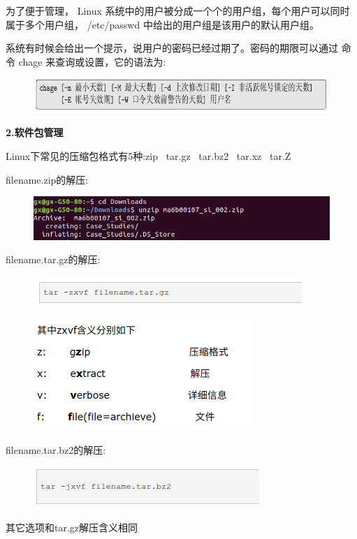 \documentclass[12pt，a4paper]{article}
\numberwithin{equation}{section}
\begin{document}
为了便于管理， Linux 系统中的用户被分成一个个的用户组，每个用户可以同时属于多个用户组， /etc/passwd 中给出的用户组是该用户的默认用户组。

系统有时候会给出一个提示，说用户的密码已经过期了。密码的期限可以通过
命令 chage 来查询或设置，它的语法为:
\begin{figure}[H]
\centering
\includegraphics[scale=0.6]{./figures/28.png}
\end{figure}
\textbf{2.软件包管理}

Linux下常见的压缩包格式有5种:zip ~tar.gz ~tar.bz2 ~tar.xz ~tar.Z

filename.zip的解压:
\begin{figure}[H]
\centering
\includegraphics[scale=0.6]{./figures/284.png}
\end{figure}
filename.tar.gz的解压:
\begin{figure}[H]
\centering
\includegraphics[scale=0.6]{./figures/285.png}
\end{figure}

\begin{figure}[H]
\centering
\includegraphics[scale=0.6]{./figures/286.png}
\end{figure}

filename.tar.bz2的解压:
\begin{figure}[H]
\centering
\includegraphics[scale=0.6]{./figures/287.png}
\end{figure}
其它选项和tar.gz解压含义相同
\end{document}
